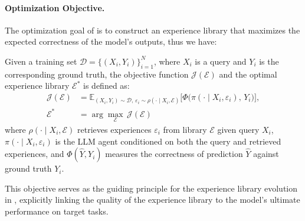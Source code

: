 \paragraph{Optimization Objective.}
The optimization goal of \method{} is to construct an experience library that maximizes the expected correctness of the model’s outputs, thus we have:
\begin{definition}
\label{def:objective}
Given a training set $\mathcal{D} = \{(X_i, Y_i)\}_{i=1}^N$, where $X_i$ is a query and $Y_i$ is the corresponding ground truth, the objective function $\mathcal{J}(\mathcal{E})$ and the optimal experience library $\mathcal{E}^*$ is defined as:
\begin{equation}
\begin{aligned}
\mathcal{J}(\mathcal{E}) 
&= \mathbb{E}_{(X_i, Y_i)\sim\mathcal{D},\, \varepsilon_i\sim\rho(\cdot\mid X_i,\mathcal{E})}
  \big[\Phi\big(\pi(\cdot\mid X_i,\varepsilon_i),\, Y_i\big)\big], \\
\mathcal{E}^* 
&= \arg\max_{\mathcal{E}}\, \mathcal{J}(\mathcal{E})
\end{aligned}
\label{eq:obj}
\end{equation}
where $\rho(\cdot\mid X_i,\mathcal{E})$ retrieves experiences $\varepsilon_i$ from library $\mathcal{E}$ given query $X_i$, $\pi(\cdot\mid X_i,\varepsilon_i)$ is the LLM agent conditioned on both the query and retrieved experiences, and $\Phi(\hat{Y}, Y_i)$ measures the correctness of prediction $\hat{Y}$ against ground truth $Y_i$.
\end{definition}
This objective serves as the guiding principle for the experience library evolution in \method{}, explicitly linking the quality of the experience library to the model's ultimate performance on target tasks.


